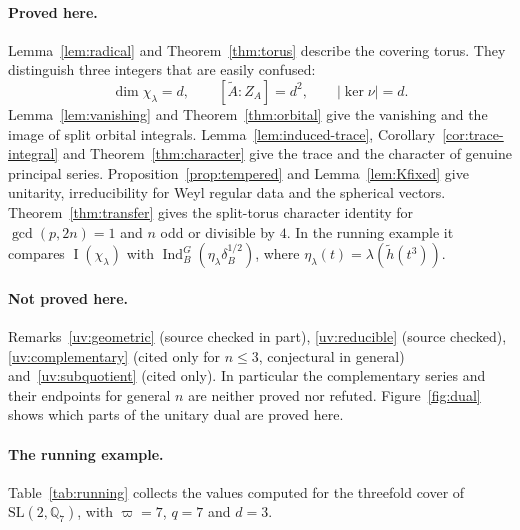 \documentclass[12pt,letterpaper]{article}
\numberwithin{equation}{section}
\theoremstyle{plain}
\theoremstyle{definition}
\theoremstyle{remark}
\newcommand{\At}{\widetilde A}
\newcommand{\hl}{\tilde h}
\newcommand{\Qq}{\mathbb Q}
\newcommand{\ZA}{Z_A}
\DeclareMathOperator{\PI}{I}
\DeclareMathOperator{\Ind}{Ind}
\newcommand{\SL}{\mathrm{SL}}
\begin{document}
\paragraph{Proved here.} Lemma~\ref{lem:radical} and
Theorem~\ref{thm:torus} describe the covering torus. They distinguish
three integers that are easily confused:
\[
\dim\chi_\lambda=d,\qquad[\At:\ZA]=d^2,\qquad|\ker\nu|=d .
\]
Lemma~\ref{lem:vanishing} and Theorem~\ref{thm:orbital} give the
vanishing and the image of split orbital integrals.
Lemma~\ref{lem:induced-trace}, Corollary~\ref{cor:trace-integral} and
Theorem~\ref{thm:character} give the trace and the character of
genuine principal series. Proposition~\ref{prop:tempered} and
Lemma~\ref{lem:Kfixed} give unitarity, irreducibility for Weyl regular
data and the spherical vectors. Theorem~\ref{thm:transfer} gives the
split-torus character identity for $\gcd(p,2n)=1$ and $n$ odd or
divisible by $4$. In the running example it compares
$\PI(\chi_\lambda)$ with $\Ind_B^G(\eta_\lambda\delta_B^{1/2})$, where
$\eta_\lambda(t)=\lambda(\hl(t^3))$.

\paragraph{Not proved here.} Remarks~\ref{uv:geometric} (source checked
in part), \ref{uv:reducible} (source checked), \ref{uv:complementary}
(cited only for $n\le3$, conjectural in general)
and~\ref{uv:subquotient} (cited only). In particular the complementary
series and their endpoints for general $n$ are neither proved nor
refuted. Figure~\ref{fig:dual} shows which parts of the unitary dual
are proved here.

\paragraph{The running example.} Table~\ref{tab:running} collects the
values computed for the threefold cover of $\SL(2,\Qq_7)$, with
$\varpi=7$, $q=7$ and $d=3$.
\end{document}
